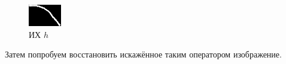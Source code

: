 \begin{figure}[h]
	\centering
	\includegraphics[width=0.3\linewidth]{../input/drawn-psf3}
	\caption{ИХ $h$}
	\label{fig:drawnPsf3}
\end{figure}
Затем попробуем восстановить искажённое таким оператором изображение.

